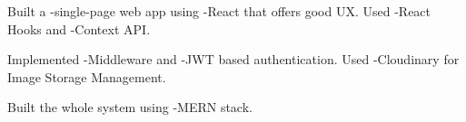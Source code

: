\documentclass[]{hieudo-build}
\begin{document}
\begin{minipage}[t]{0.65\textwidth}
\href{https://github.com/Sid330s/Instagram-Clone}{}
\begin{tightemize}
\item Built a {\makebl -single-page} web app using {\makebl -React} that offers good UX. Used {\makebl -React} Hooks and {\makebl -Context API}.
\item Implemented {\makebl -Middleware} and {\makebl -JWT based authentication}. Used {\makebl -Cloudinary} for Image Storage Management.
\item Built the whole system using {\makebl -MERN stack}.
\end{tightemize}
\sectionsep


\end{minipage} 
\end{document}
